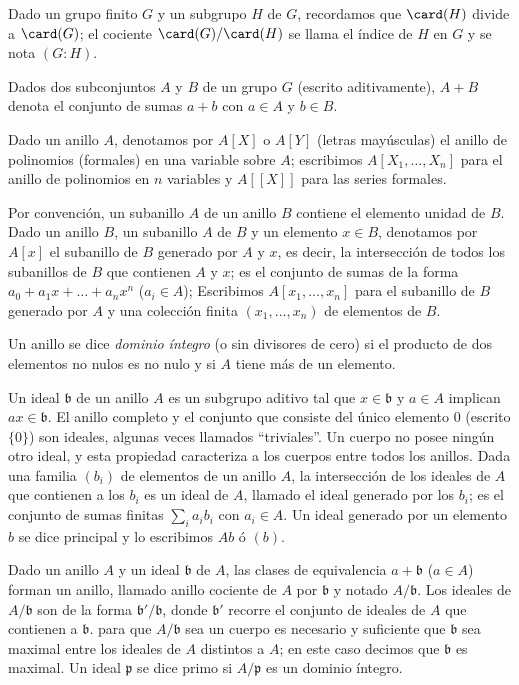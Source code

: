 \documentclass[bibtotoc,leqno,spanish]{amsbook}
\newcommand{\idl}[1]{\mathfrak{#1}}
\numberwithin{equation}{section}
\theoremstyle{note}
\theoremstyle{note}
\theoremstyle{rem}
\numberwithin{theorem}{section}
\numberwithin{proposition}{section}
\numberwithin{definition}{section}
\numberwithin{lemma}{section}
\numberwithin{corollary}{section}
\numberwithin{example}{section}
\numberwithin{footnote}{section}%
\begin{document}
Dado un grupo finito $G$ y un subgrupo $H$ de $G$, recordamos que $\card(H)$ divide
a $\card(G)$; el cociente $\card(G)/\card(H)$ se llama el \'indice de $H$ en $G$ y
se nota $(G:H)$.

Dados dos subconjuntos $A$ y $B$ de un grupo $G$ (escrito aditivamente), $A+B$
denota el conjunto de sumas $a+b$ con $a\in A$ y $b\in B$.

Dado un anillo $A$, denotamos por $A[X]$ o $A[Y]$ (letras may\'usculas)
el anillo de polinomios (formales) en una variable sobre $A$; escribimos
$A[X_{1},\dots,X_{n}]$ para el anillo de polinomios en $n$ variables y $A[[X]]$ para las
series formales.

Por convenci\'on, un subanillo $A$ de un anillo $B$ contiene el elemento unidad de $B$.
Dado un anillo $B$, un subanillo $A$ de $B$ y un elemento $x\in B$, denotamos por
$A[x]$ el subanillo de $B$ generado por $A$ y $x$, es decir, la intersecci\'on de todos
los subanillos de $B$ que contienen $A$ y $x$; es el conjunto de sumas de la forma
$a_{0}+a_{1}x+\dots+a_{n}x^{n}$ ($a_{i}\in A$); Escribimos $A[x_{1},\dots,x_{n}]$
para el subanillo de $B$ generado por $A$ y una colecci\'on finita $(x_{1},\dots,x_{n})$
de elementos de $B$.

Un anillo se dice \emph{dominio \'integro} (o sin divisores de cero) si el producto de dos
elementos no nulos es no nulo y si $A$ tiene m\'as de un elemento.

Un ideal $\idl{b}$ de un anillo $A$ es un subgrupo aditivo tal que $x\in\idl{b}$
y $a\in A$ implican $ax\in\idl{b}$. El anillo completo y el conjunto que consiste del
\'unico elemento $0$ (escrito $\{0\}$) son ideales, algunas veces llamados ``triviales''.
Un cuerpo no posee ning\'un otro ideal, y esta propiedad caracteriza a los cuerpos
entre todos los anillos. Dada una familia $(b_{i})$ de elementos de un anillo $A$, la intersecci\'on
de los ideales de $A$ que contienen a los $b_{i}$ es un ideal de $A$, llamado el ideal
generado por los $b_{i}$; es el conjunto de sumas finitas $\sum_{i}a_{i}b_{i}$ con $a_{i}\in A$.
Un ideal generado por un elemento $b$ se dice principal y lo escribimos $Ab$ \'o $(b)$.

Dado un anillo $A$ y un ideal $\idl{b}$ de $A$, las clases de equivalencia $a+\idl{b}$
($a\in A$) forman un anillo, llamado anillo cociente de $A$ por $\idl{b}$ y notado
$A/\idl{b}$. Los ideales de $A/\idl{b}$ son de la forma $\idl{b}'/\idl{b}$, donde
$\idl{b}'$ recorre el conjunto de ideales de $A$ que contienen a $\idl{b}$. para que
$A/\idl{b}$ sea un cuerpo es necesario y suficiente que $\idl{b}$ sea maximal entre los ideales
de $A$ distintos a $A$; en este caso decimos que $\idl{b}$ es maximal. Un ideal $\idl{p}$
se dice primo si $A/\idl{p}$ es un dominio \'integro.
\end{document}
